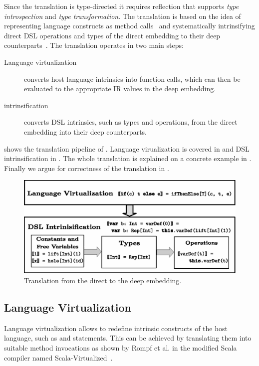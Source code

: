 Since the translation is type-directed it requires reflection that supports
 \emph{type introspection} and \emph{type transformation}. The translation is based on the idea of representing language constructs as method calls~\cite{carette_finally_2009,rompf_scala-virtualized:_2009} and systematically intrinsifying direct DSL operations and types of the direct embedding to their deep counterparts~\cite{carette_finally_2009}. The translation operates in two main steps:
\begin{description}
\item[Language virtualization] converts host language intrinsics into
  function calls, which can then be evaluated to the appropriate IR
  values in the deep embedding.
\item[\edsl{} intrinsification] converts DSL intrinsics, such as types and operations,
 from the direct embedding into their deep counterparts.
\end{description}

 shows the translation pipeline of \yy. Language virualization is covered
in  and DSL intrinsification
in . The whole translation is explained on a concrete example
in . Finally we argue for correctness of the translation
in .

\begin{figure}
\centering
\includegraphics{diagrams/pipeline.eps}
\caption{Translation from the direct to the deep embedding.}
\label{fig:pipeline}
\end{figure}

\subsection{Language Virtualization}
\label{sec:langauge-virtualization}
Language virtualization allows to redefine intrinsic constructs of the
host language, such as  and  statements. This can be
achieved by translating them into suitable method invocations as shown by Rompf
et al. in the modified Scala compiler named Scala-Virtualized~\cite{rompf_scala-virtualized:_2009}.

